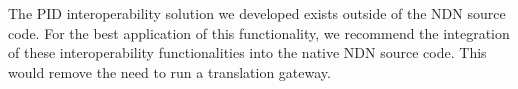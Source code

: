 The PID interoperability solution we developed exists outside of the NDN source code. For the best application of this functionality, we recommend the integration of these interoperability functionalities into the native NDN source code. This would remove the need to run a translation gateway.



